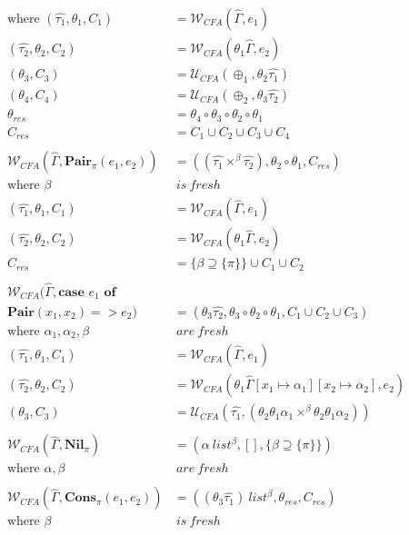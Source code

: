 \documentclass[a4paper,11pt]{article}
\newcommand{\bigU}{\ensuremath{\mathcal{U}_{CFA}}\xspace}
\newcommand{\bigW}{\ensuremath{\mathcal{W}_{CFA}}\xspace}
\begin{document}
\begin{align*}
  \text{where }(\hat{\tau_1}, \theta_1, C_1) &= \bigW (\hat{\Gamma}, e_1)\\
  (\hat{\tau_2}, \theta_2, C_2) &= \bigW (\theta_1 \hat{\Gamma}, e_2)\\
  (\theta_3, C_3) &= \bigU (\oplus_1, \theta_2 \hat{\tau_1})\\
  (\theta_4, C_4) &= \bigU (\oplus_2, \theta_3 \hat{\tau_2})\\
  \theta_{res} &= \theta_4 \circ \theta_3 \circ \theta_2 \circ \theta_1\\
  C_{res} &= C_1 \cup C_2 \cup C_3 \cup C_4\\
  \\
  \bigW (\hat{\Gamma}, \textbf{Pair}_\pi (e_1, e_2)) &= ((\hat{\tau_1} \times^{\beta} \hat{\tau_2}), \theta_2 \circ \theta_1, C_{res}) \\
  \text{where }\beta & ~is~fresh\\
  (\hat{\tau_1}, \theta_1, C_1) &= \bigW (\hat{\Gamma}, e_1)\\
  (\hat{\tau_2}, \theta_2, C_2) &= \bigW (\theta_1 \hat{\Gamma}, e_2)\\
  C_{res} &= \{\beta \supseteq \{\pi\}\} \cup C_1 \cup C_2 \\
  \\
  \bigW (\hat{\Gamma}, \textbf{case }e_1\textbf{ of}\\\textbf{Pair}(x_1,x_2) => e_2) &= (\theta_3 \hat{\tau_2}, \theta_3 \circ \theta_2 \circ \theta_1, C_1 \cup C_2 \cup C_3)\\
  \text{where }\alpha_1, \alpha_2, \beta & ~are~fresh\\
  (\hat{\tau_1}, \theta_1, C_1) &= \bigW (\hat{\Gamma}, e_1)\\
  (\hat{\tau_2}, \theta_2, C_2) &= \bigW (\theta_1 \hat{\Gamma}[x_1 \mapsto \alpha_1][x_2 \mapsto \alpha_2], e_2)\\
  (\theta_3, C_3) &= \bigU (\hat{\tau_1}, (\theta_2 \theta_1 \alpha_1 \times^\beta \theta_2 \theta_1 \alpha_2))\\
  \\
  \bigW (\hat{\Gamma}, \textbf{Nil}_\pi) &= (\alpha~list^\beta, [], \{\beta \supseteq \{\pi\}\})\\
  \text{where }\alpha, \beta & ~are~fresh\\
  \\
  \bigW (\hat{\Gamma}, \textbf{Cons}_\pi (e_1, e_2)) &= ((\theta_3 \hat{\tau_1}) ~ list^\beta, \theta_{res}, C_{res})\\
  \text{where }\beta & ~is~fresh\\

\end{align*}
\end{document}

